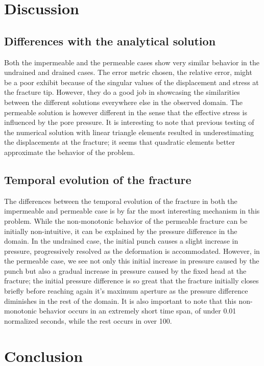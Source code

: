 \documentclass{article}
\begin{document}
\FloatBarrier

\section{Discussion}

\subsection{Differences with the analytical solution}
Both the impermeable and the permeable cases show very similar behavior in the undrained and drained cases. The error metric chosen, the relative error, might be a poor exhibit because of the singular values of the displacement and stress at the fracture tip. However, they do a good job in showcasing the similarities between the different solutions everywhere else in the observed domain. The permeable solution is however different in the sense that the effective stress is influenced by the pore pressure. It is interesting to note that previous testing of the numerical solution with linear triangle elements resulted in underestimating the displacements at the fracture; it seems that quadratic elements better approximate the behavior of the problem.

\subsection{Temporal evolution of the fracture}
The differences between the temporal evolution of the fracture in both the impermeable and permeable case is by far the most interesting mechanism in this problem. While the non-monotonic behavior of the permeable fracture can be initially non-intuitive, it can be explained by the pressure difference in the domain. In the undrained case, the initial punch causes a slight increase in pressure, progressively resolved as the deformation is accommodated. However, in the permeable case, we see not only this initial increase in pressure caused by the punch but also a gradual increase in pressure caused by the fixed head at the fracture; the initial pressure difference is so great that the fracture initially closes briefly before reaching again it's maximum aperture as the pressure difference diminishes in the rest of the domain. It is also important to note that this non-monotonic behavior occurs in an extremely short time span, of under 0.01 normalized seconds, while the rest occurs in over 100. 

\section{Conclusion}
\end{document}
